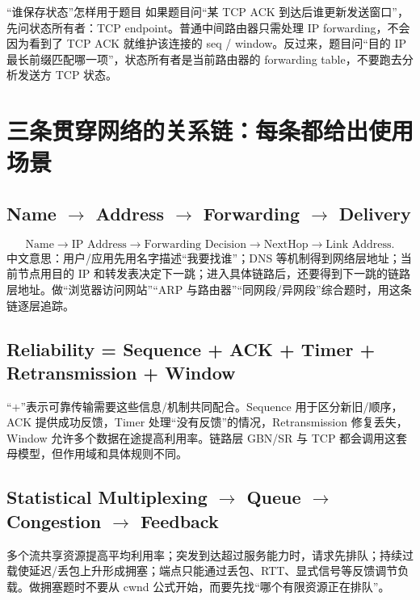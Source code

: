 \documentclass[11pt,a4paper,openany]{ctexbook}
\begin{document}
\begin{methodbox}{“谁保存状态”怎样用于题目}
如果题目问“某 TCP ACK 到达后谁更新发送窗口”，先问状态所有者：TCP endpoint。普通中间路由器只需处理 IP forwarding，不会因为看到了 TCP ACK 就维护该连接的 seq / window。反过来，题目问“目的 IP 最长前缀匹配哪一项”，状态所有者是当前路由器的 forwarding table，不要跑去分析发送方 TCP 状态。
\end{methodbox}

\section{三条贯穿网络的关系链：每条都给出使用场景}
\subsection{Name $\rightarrow$ Address $\rightarrow$ Forwarding $\rightarrow$ Delivery}
\[
\boxed{\text{Name}\rightarrow\text{IP Address}\rightarrow\text{Forwarding Decision}\rightarrow\text{NextHop}\rightarrow\text{Link Address}}.
\]
中文意思：用户/应用先用名字描述“我要找谁”；DNS 等机制得到网络层地址；当前节点用目的 IP 和转发表决定下一跳；进入具体链路后，还要得到下一跳的链路层地址。做“浏览器访问网站”“ARP 与路由器”“同网段/异网段”综合题时，用这条链逐层追踪。

\subsection{Reliability = Sequence + ACK + Timer + Retransmission + Window}
“$+$”表示可靠传输需要这些信息/机制共同配合。Sequence 用于区分新旧/顺序，ACK 提供成功反馈，Timer 处理“没有反馈”的情况，Retransmission 修复丢失，Window 允许多个数据在途提高利用率。链路层 GBN/SR 与 TCP 都会调用这套母模型，但作用域和具体规则不同。

\subsection{Statistical Multiplexing $\rightarrow$ Queue $\rightarrow$ Congestion $\rightarrow$ Feedback}
多个流共享资源提高平均利用率；突发到达超过服务能力时，请求先排队；持续过载使延迟/丢包上升形成拥塞；端点只能通过丢包、RTT、显式信号等反馈调节负载。做拥塞题时不要从 cwnd 公式开始，而要先找“哪个有限资源正在排队”。
\end{document}
